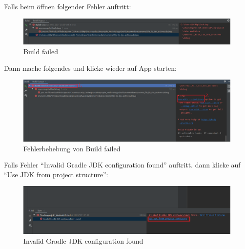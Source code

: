 \documentclass[12pt, onecolumn, notitlepage]{scrartcl}
\begin{document}
Falls beim öffnen folgender Fehler auftritt:
\begin{figure}[H]
\includegraphics[width=1\textwidth]{build_Fehler.PNG}
\caption{Build failed}
\end{figure}
Dann mache folgendes und klicke wieder auf App starten:
\begin{figure}[H]
\includegraphics[width=1\textwidth]{build_Klick.PNG}
\caption{Fehlerbehebung von Build failed}
\end{figure}
Falls Fehler \enquote{Invalid Gradle JDK configuration found} auftritt. dann klicke auf \enquote{Use JDK from project structure}:
\begin{figure}[H]
	\includegraphics[width=1\textwidth]{invalid_gradle.png}
	\caption{Invalid Gradle JDK configuration found}
\end{figure}
\end{document}
